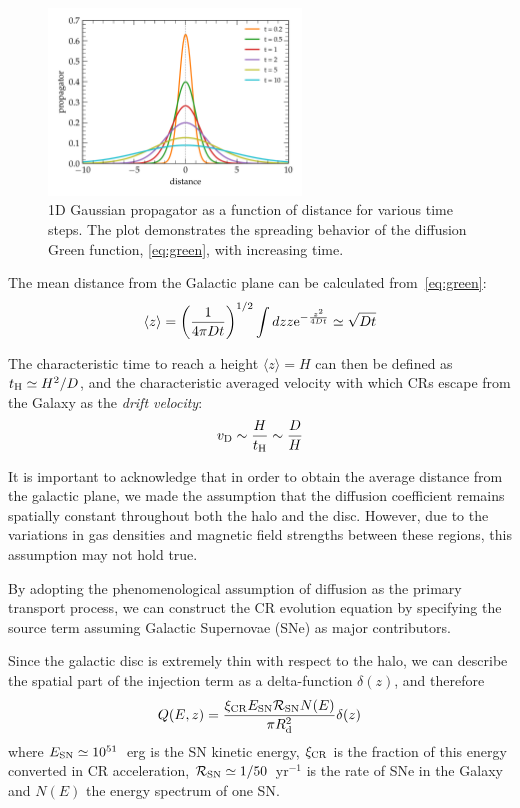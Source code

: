 \begin{figure}[t]
\centering
\includegraphics[width=0.6\textwidth]{figures/gaussian_1D.pdf} 
\caption{1D Gaussian propagator as a function of distance for various time steps. The plot demonstrates the spreading behavior of the diffusion Green function, \ref{eq:green}, with increasing time.}
\label{fig:gaussian1d}
\end{figure}

The mean distance from the Galactic plane can be calculated from~\ref{eq:green}:
%
\begin{equation}
\langle z \rangle = \left(\frac{1}{{4 \pi D t}}\right)^{1/2} \int dz z {\rm e}^{-\frac{z^2}{4Dt}} \simeq \sqrt{Dt}
\end{equation}

The characteristic time to reach a height $\langle z \rangle = H$ can then be defined as  $t_{\rm H} \simeq H^2 / D$, and the characteristic averaged velocity with which CRs escape from the Galaxy as the \emph{drift velocity}:
%
\begin{equation}
v_{\rm D} \sim \frac{H}{t_{\rm H}} \sim \frac{D}{H}
\end{equation}

It is important to acknowledge that in order to obtain the average distance from the galactic plane, we made the assumption that the diffusion coefficient remains spatially constant throughout both the halo and the disc. However, due to the variations in gas densities and magnetic field strengths between these regions, this assumption may not hold true.

By adopting the phenomenological assumption of diffusion as the primary transport process, we can construct the CR evolution equation by specifying the source term assuming Galactic Supernovae (SNe) as major contributors.

Since the galactic disc is extremely thin with respect to the halo, we can describe the spatial part of the injection term as a delta-function $\delta(z)$, and therefore
%
\begin{equation}\label{eq:qprotons}
Q(E,z) = \frac{\xi_{\rm CR} E_{\rm SN} \mathcal R_{\rm SN} N(E)}{\pi R_{\rm d}^2} \delta(z) 
\end{equation}
%
where $E_{\rm SN} \simeq 10^{51}$~erg is the SN kinetic energy, $\xi_{\rm CR}$ is the fraction of this energy converted in CR acceleration, $\mathcal R_{\rm SN} \simeq 1 / 50$~yr$^{-1}$ is the rate of SNe in the Galaxy and $N(E)$ the energy spectrum of one SN. 

